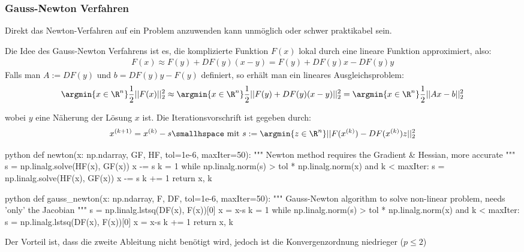 \subsubsection{Gauss-Newton Verfahren}
Direkt das Newton-Verfahren auf ein Problem anzuwenden kann unmöglich oder schwer praktikabel sein.

Die Idee des Gauss-Newton Verfahrens ist es, die komplizierte Funktion $F(x)$ lokal durch eine lineare Funktion approximiert, also:
\begin{align*}
    F(x) \approx F(y) + DF(y) (x - y) = F(y) + DF(y)x - DF(y)y
\end{align*}
Falls man $A := DF(y)$ und $b = DF(y)y - F(y)$ definiert, so erhält man ein lineares Ausgleichsproblem:
\rmvspace
\begin{align*}
    \argmin{x \in \R^n} \frac{1}{2} ||F(x)||^2_2 \approx \argmin{x \in \R^n} \frac{1}{2} ||F(y) + DF(y)(x - y)||^2_2 = \argmin{x \in \R^n} \frac{1}{2} ||Ax - b||^2_2
\end{align*}

\drmvspace
wobei $y$ eine Näherung der Lösung $x$ ist.
Die Iterationsvorschrift ist gegeben durch:
\rmvspace
\begin{align*}
    x^{(k + 1)} = x^{(k)} - s \smallhspace \text{ mit } s := \argmin{z \in \R^n} ||F(x^{(k)}) - DF(x^{(k)})z||^2_2
\end{align*}

\begin{code}{python}
def newton(x: np.ndarray, GF, HF, tol=1e-6, maxIter=50):
    """ Newton method requires the Gradient & Hessian, more accurate """
    s = np.linalg.solve(HF(x), GF(x))
    x -= s
    k = 1
    while np.linalg.norm(s) > tol * np.linalg.norm(x) and k < maxIter:
        s = np.linalg.solve(HF(x), GF(x))
        x -= s
        k += 1
    return x, k
\end{code}

\begin{code}{python}
def gauss_newton(x: np.ndarray, F, DF, tol=1e-6, maxIter=50):
    """ Gauss-Newton algorithm to solve non-linear problem, needs 'only' the Jacobian """
    s = np.linalg.lstsq(DF(x), F(x))[0]
    x = x-s
    k = 1
    while np.linalg.norm(s) > tol * np.linalg.norm(x) and k < maxIter:
        s = np.linalg.lstsq(DF(x), F(x))[0]
        x = x-s
        k += 1
    return x, k
\end{code}

Der Vorteil ist, dass die zweite Ableitung nicht benötigt wird, jedoch ist die Konvergenzordnung niedrieger ($p \leq 2$)


